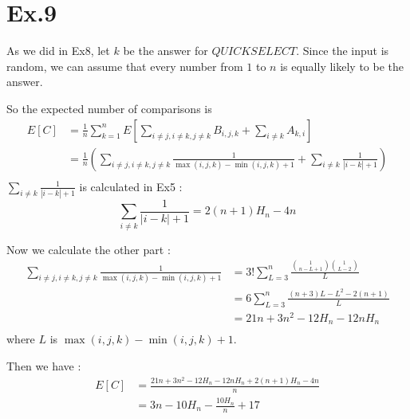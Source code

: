 \section{Ex.9}
	As we did in Ex8, let $k$ be the answer for $QUICKSELECT$. Since the input is random, we can assume that every number from $1$ to $n$ is equally likely to be the answer.\par
	So the expected number of comparisons is
	\begin{align*}
		E[C] &= \frac{1}{n}\sum_{k=1}^{n}E[\sum_{i\neq j, i\neq k, j\neq k}B_{i,j,k}+\sum_{i\neq k}A_{k,i}]\\
		&= \frac{1}{n}(\sum_{i\neq j, i\neq k, j\neq k}\frac{1}{\max(i,j,k)-\min(i,j,k) + 1} + \sum_{i\neq k}\frac{1}{|i-k|+1})\\
	\end{align*}
		$\sum_{i\neq k}\frac{1}{|i-k|+1}$ is calculated in Ex5 : $$\sum_{i\neq k}\frac{1}{|i-k|+1}=2(n+1)H_n-4n$$\par
		Now we calculate the other part :
	\begin{align*}
		\sum_{i\neq j, i\neq k, j\neq k}\frac{1}{\max(i,j,k)-\min(i,j,k) + 1} &= 3!\sum_{L=3}^{n}\frac{\binom{1}{n-L+1}\binom{1}{L-2}}{L}\\
		&= 6\sum_{L=3}^{n}\frac{(n+3)L-L^2-2(n+1)}{L}\\
		&= 21n+3n^2-12H_n-12nH_n\\
	\end{align*}
	where $L$ is $\max(i,j,k)-\min(i,j,k)+1$.\par
	Then we have :
	\begin{align*}
			E[C] &= \frac{21n+3n^2-12H_n-12nH_n+2(n+1)H_n-4n}{n}\\
			&= 3n-10H_n-\frac{10H_n}{n}+17\\
	\end{align*}